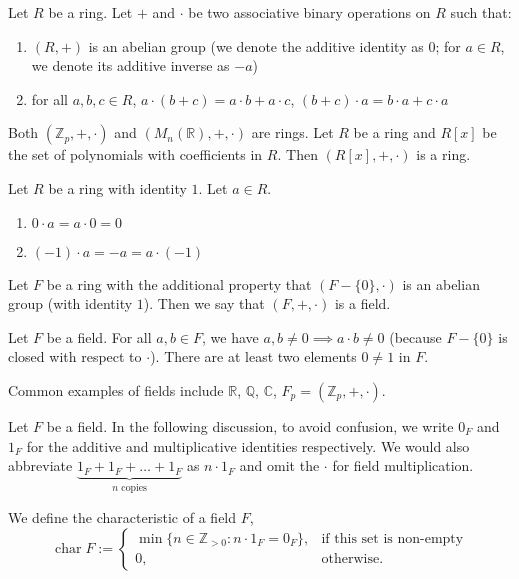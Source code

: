 \documentclass{scrartcl}
\def\Z{\mathbb{Z}}
\def\R{\mathbb{R}}
\def\C{\mathbb{C}}
\def\Q{\mathbb{Q}}
\DeclareMathOperator{\charf}{char}
\begin{document}
\begin{definition}
	Let $R$ be a ring. Let $+$ and $\cdot$ be two associative binary operations on $R$ such that: 
	\begin{enumerate}
		\item $(R, +)$ is an abelian group (we denote the additive identity as $0$; for $a\in R$, we denote its additive inverse as $-a$)
		\item for all $a, b, c \in R$, $a\cdot(b+c) = a\cdot b + a \cdot c$, $(b+c)\cdot a = b \cdot a + c\cdot a$
	\end{enumerate}
\end{definition}
\begin{example}
	Both $(\Z_p, +, \cdot)$ and $(M_n(\R), +, \cdot)$ are rings. Let $R$ be a ring and $R[x]$ be the set of polynomials with coefficients in $R$. Then $(R[x], +, \cdot)$ is a ring. 
\end{example}
\begin{lemma}
	Let $R$ be a ring with identity $1$. Let $a \in R$. 
	\begin{enumerate}
		\item $0 \cdot a = a \cdot 0 = 0$
		\item $(-1)\cdot a = -a = a \cdot (-1)$
	\end{enumerate}
\end{lemma}
\begin{definition}
	Let $F$ be a ring with the additional property that $(F-\{0\}, \cdot)$ is an abelian group (with identity $1$). Then we say that $(F, +, \cdot)$ is a field. 
\end{definition}
\begin{remark}
	Let $F$ be a field. For all $a, b \in F$, we have $a, b \ne 0 \implies a\cdot b \ne 0$ (because $F-\{0\}$ is closed with respect to $\cdot$). There are at least two elements $0\ne 1$ in $F$. 
\end{remark}
\begin{example}
	Common examples of fields include $\R$, $\Q$, $\C$, $F_p = (\Z_p, +, \cdot)$. 
\end{example}
Let $F$ be a field. In the following discussion, to avoid confusion, we write $0_F$ and $1_F$ for the additive and multiplicative identities respectively. We would also abbreviate $\underbrace{1_F+1_F+\dots + 1_F}_{n \text{ copies}}$ as $n \cdot 1_F$ and omit the $\cdot$ for field multiplication. 
\begin{definition}
	We define the characteristic of a field $F$, 
	\[\charf{F} := \begin{cases}
		\min \{n\in \Z_{>0}: n\cdot 1_F = 0_F\}, & \text{if this set is non-empty} \\
		0, & \text{otherwise}.
	\end{cases}\]
\end{definition}
\end{document}
